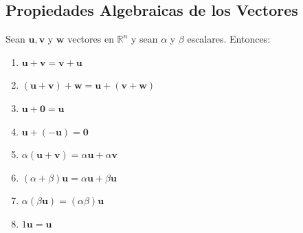 \subsection{Propiedades Algebraicas de los Vectores}
\begin{caja_amarilla}
	Sean $\mathbf{u}, \mathbf{v}$ y $\mathbf{w}$ vectores en $\mathbb{R}^n$ y sean $\alpha$ y $\beta$ escalares. Entonces:
	
	\begin{enumerate}
		\item $\mathbf{u} + \mathbf{v} = \mathbf{v} + \mathbf{u}$
		\item $(\mathbf{u} + \mathbf{v}) + \mathbf{w} = \mathbf{u} + (\mathbf{v} + \mathbf{w})$
		\item $\mathbf{u} + \mathbf{0} = \mathbf{u}$
		\item $\mathbf{u} + (-\mathbf{u}) = \mathbf{0}$
		\item $\alpha(\mathbf{u} + \mathbf{v}) = \alpha\mathbf{u} + \alpha\mathbf{v}$
		\item $(\alpha + \beta)\mathbf{u} = \alpha\mathbf{u} + \beta\mathbf{u}$
		\item $\alpha(\beta\mathbf{u}) = (\alpha\beta)\mathbf{u}$
		\item $1\mathbf{u} = \mathbf{u}$
	\end{enumerate}
\end{caja_amarilla}

